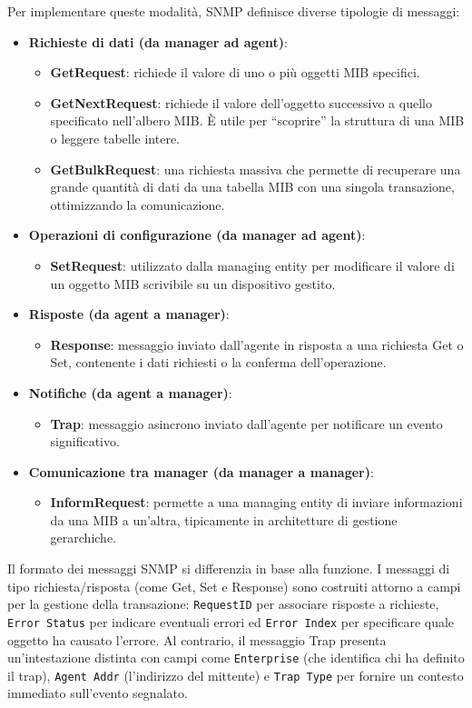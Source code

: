 Per implementare queste modalità, SNMP definisce diverse tipologie di messaggi:

\begin{itemize}
\item \textbf{Richieste di dati (da manager ad agent)}:
\begin{itemize}
\item \textbf{GetRequest}: richiede il valore di uno o più oggetti MIB
specifici.
\item \textbf{GetNextRequest}: richiede il valore dell'oggetto successivo a
quello specificato nell'albero MIB. È utile per ``scoprire'' la struttura di
una MIB o leggere tabelle intere.
\item \textbf{GetBulkRequest}: una richiesta massiva che permette di recuperare
una grande quantità di dati da una tabella MIB con una singola transazione,
ottimizzando la comunicazione.
\end{itemize}
\item \textbf{Operazioni di configurazione (da manager ad agent)}:
\begin{itemize}
\item \textbf{SetRequest}: utilizzato dalla managing entity per modificare il
valore di un oggetto MIB scrivibile su un dispositivo gestito.
\end{itemize}
\item \textbf{Risposte (da agent a manager)}:
\begin{itemize}
\item \textbf{Response}: messaggio inviato dall'agente in risposta a una
richiesta Get o Set, contenente i dati richiesti o la conferma
dell'operazione.
\end{itemize}
\item \textbf{Notifiche (da agent a manager)}:
\begin{itemize}
\item \textbf{Trap}: messaggio asincrono inviato dall'agente per notificare un
evento significativo.
\end{itemize}
\item \textbf{Comunicazione tra manager (da manager a manager)}:
\begin{itemize}
\item \textbf{InformRequest}: permette a una managing entity di inviare
informazioni da una MIB a un'altra, tipicamente in architetture di gestione
gerarchiche.
\end{itemize}
\end{itemize}

Il formato dei messaggi SNMP si differenzia in base alla funzione. I messaggi
di tipo richiesta/risposta (come Get, Set e Response) sono costruiti attorno a
campi per la gestione della transazione: \texttt{RequestID} per associare
risposte a richieste, \texttt{Error Status} per indicare eventuali errori ed
\texttt{Error Index} per specificare quale oggetto ha causato l'errore.
Al contrario, il messaggio Trap presenta un'intestazione distinta con campi come
\texttt{Enterprise} (che identifica chi ha definito il trap), \texttt{Agent Addr}
(l'indirizzo del mittente) e \texttt{Trap Type} per fornire un contesto immediato
sull'evento segnalato.

